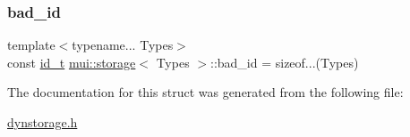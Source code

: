 \subsubsection{\texorpdfstring{bad\+\_\+id}{bad\_id}}
{\footnotesize\ttfamily template$<$typename... Types$>$ \\
const \hyperlink{structmui_1_1storage_a1e1d8c3e802463d4b0e3804865e365de}{id\+\_\+t} \hyperlink{structmui_1_1storage}{mui\+::storage}$<$ Types $>$\+::bad\+\_\+id = sizeof...(Types)\hspace{0.3cm}{\ttfamily [static]}}



The documentation for this struct was generated from the following file\+:\begin{DoxyCompactItemize}
\item 
\hyperlink{dynstorage_8h}{dynstorage.\+h}\end{DoxyCompactItemize}
